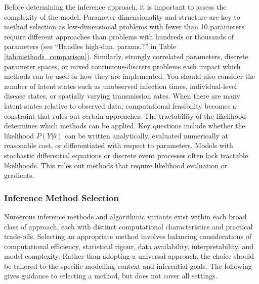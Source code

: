 \documentclass{article}
\begin{document}
Before determining the inference approach, it is important to assess the complexity of the model.
Parameter dimensionality and structure are key to method selection as low-dimensional problems with fewer than 10 parameters require different approaches than problems with hundreds or thousands of parameters (see ``Handles high-dim. params.?'' in Table \ref{tab:methods_comparison}).
Similarly, strongly correlated parameters, discrete parameter spaces, or mixed continuous-discrete problems each impact which methods can be used or how they are implemented.
You should also consider the number of latent states such as unobserved infection times, individual-level disease states, or spatially varying transmission rates.
When there are many latent states relative to observed data, computational feasibility becomes a constraint that rules out certain approaches.
The tractability of the likelihood determines which methods can be applied.
Key questions include whether the likelihood $P(Y | \theta)$ can be written analytically, evaluated numerically at reasonable cost, or differentiated with respect to parameters.
Models with stochastic differential equations or discrete event processes often lack tractable likelihoods.
This rules out methods that require likelihood evaluation or gradients.

\subsubsection{Inference Method Selection}

Numerous inference methods and algorithmic variants exist within each broad class of approach, each with distinct computational characteristics and practical trade-offs.
Selecting an appropriate method involves balancing considerations of computational efficiency, statistical rigour, data availability, interpretability, and model complexity.
Rather than adopting a universal approach, the choice should be tailored to the specific modelling context and inferential goals.
The following gives guidance to selecting a method, but does not cover all settings.
\end{document}
